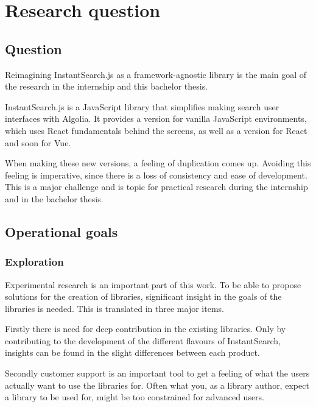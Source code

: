 
\chapter{Research question} %
\label{chp:research_question}
\section{Question}
\label{sec:question}

Reimagining InstantSearch.js as a framework-agnostic \gls{library} is the main goal of the research in the internship and this bachelor thesis.

InstantSearch.js is a JavaScript \gls{library} that simplifies making search user interfaces with Algolia. It provides a version for vanilla JavaScript environments, which uses React fundamentals behind the screens, as well as a version for React and soon for Vue.

When making these new versions, a feeling of duplication comes up. Avoiding this feeling is imperative, since there is a loss of consistency and ease of development. This is a major challenge and is topic for practical research during the internship and in the bachelor thesis.

\section{Operational goals}
\label{sec:operational_goals}

\subsection{Exploration}

Experimental research is an important part of this work. To be able to propose solutions for the creation of libraries, significant insight in the goals of the libraries is needed. This is translated in three major items. 

Firstly there is need for deep contribution in the existing libraries. Only by contributing to the development of the different flavours of InstantSearch, insights can be found in the slight differences between each product.

Secondly customer support is an important tool to get a feeling of what the users actually want to use the libraries for. Often what you, as a \gls{library} author, expect a \gls{library} to be used for, might be too constrained for advanced users.

